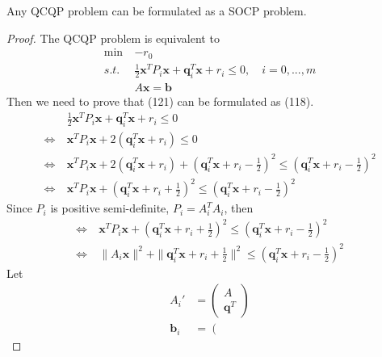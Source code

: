 \begin{lemma}
    Any QCQP problem can be formulated as a SOCP problem.
\end{lemma}
\begin{proof}
    The QCQP problem is equivalent to
    \begin{align}
        \min \ & - r_0 \\
        s.t. \ &\frac{1}{2} \mathbf{x}^T P_i \mathbf{x}
        + \mathbf{q}_i^T \mathbf{x} + r_i \leq 0, \quad i = 0,...,m \\
        & A \mathbf{x} = \mathbf{b}
    \end{align}
    Then we need to prove that (121) can be formulated as (118).
    \begin{align}
        &\frac{1}{2} \mathbf{x}^T P_i \mathbf{x}
        + \mathbf{q}_i^T \mathbf{x} + r_i \leq 0 \\
        \Leftrightarrow \ & \mathbf{x}^T P_i \mathbf{x}
        + 2(\mathbf{q}_i^T \mathbf{x} + r_i) \leq 0 \\
        \Leftrightarrow \ & \mathbf{x}^T P_i \mathbf{x}
        + 2(\mathbf{q}_i^T \mathbf{x} + r_i)
        + (\mathbf{q}_i^T \mathbf{x} + r_i - \frac{1}{2})^2
         \leq (\mathbf{q}_i^T \mathbf{x} + r_i - \frac{1}{2})^2 \\
         \Leftrightarrow \ & \mathbf{x}^T P_i \mathbf{x}
         + (\mathbf{q}_i^T \mathbf{x} + r_i + \frac{1}{2})^2
          \leq (\mathbf{q}_i^T \mathbf{x} + r_i - \frac{1}{2})^2
    \end{align}
    Since $P_i$ is positive semi-definite, $P_i = A_i^TA_i$, then
    \begin{align}
        \Leftrightarrow \ & \mathbf{x}^T P_i \mathbf{x}
        + (\mathbf{q}_i^T \mathbf{x} + r_i + \frac{1}{2})^2
         \leq (\mathbf{q}_i^T \mathbf{x} + r_i - \frac{1}{2})^2 \\
         \Leftrightarrow \ & \parallel A_i \mathbf{x} \parallel^2
         + \parallel \mathbf{q}_i^T \mathbf{x} + r_i + \frac{1}{2}\parallel^2
          \leq (\mathbf{q}_i^T \mathbf{x} + r_i - \frac{1}{2})^2 
    \end{align}
    Let
    \begin{align}
        A_i' &= \left(
            \begin{array}{ll}
                A \\
                \mathbf{q}^T
            \end{array}\right) \\
            \mathbf{b}_i &= \left(
                \begin{array}{ll}

\end{array}
\end{align}
\end{proof}
